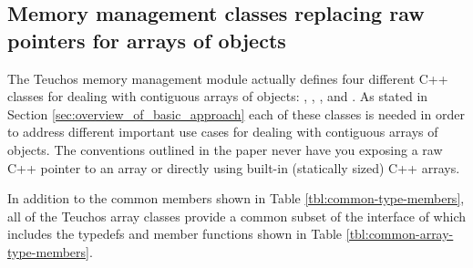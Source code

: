 \documentclass[pdf,ps2pdf,11pt]{SANDreport}
\begin{document}
%
{}\subsection{Memory management classes replacing raw pointers for
arrays of objects}
\label{sec:array-classes}
%

The Teuchos memory management module actually defines four different
C++ classes for dealing with contiguous arrays of objects:
{}, {}, {}, and
{}.  As stated in Section
{}\ref{sec:overview_of_basic_approach} each of these classes is needed
in order to address different important use cases for dealing with
contiguous arrays of objects.  The conventions outlined in the paper
never have you exposing a raw C++ pointer to an array or directly
using built-in (statically sized) C++ arrays.

In addition to the common members shown in Table
{}\ref{tbl:common-type-members}, all of the Teuchos array classes
provide a common subset of the interface of {} which
includes the typedefs and member functions shown in Table
{}\ref{tbl:common-array-type-members}.
\end{document}

